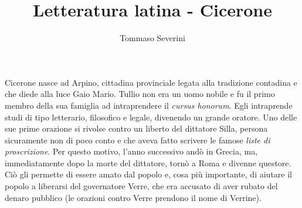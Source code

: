 \documentclass[10pt,a4paper]{article}
\author{Tommaso Severini}
\title{Letteratura latina - Cicerone}
\begin{document}
	\maketitle

Cicerone nasce ad Arpino, cittadina provinciale legata alla tradizione contadina e che diede alla luce Gaio Mario. Tullio non era un uomo nobile e fu il primo membro della sua famiglia ad intraprendere il \textit{cursus honorum}. Egli intraprende studi di tipo letterario, filosofico e legale, divenendo un grande oratore. Uno delle sue prime orazione si rivolse contro un liberto del dittatore Silla, persona sicuramente non di poco conto e che aveva fatto scrivere le famose \textit{liste di proscrizione}. Per questo motivo, l'anno successivo andò in Grecia, ma, immediatamente dopo la morte del dittatore, tornò a Roma e divenne questore. Ciò gli permette di essere amato dal popolo e, cosa più importante, di aiutare il popolo a liberarsi del governatore Verre, che era accusato di aver rubato del denaro pubblico (le orazioni contro Verre prendono il nome di Verrine).  
\end{document}
